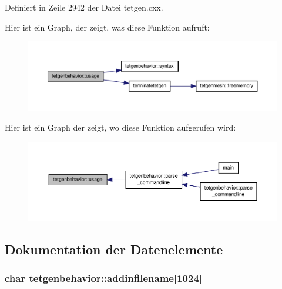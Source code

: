 Definiert in Zeile 2942 der Datei tetgen.\-cxx.



Hier ist ein Graph, der zeigt, was diese Funktion aufruft\-:
\nopagebreak
\begin{figure}[H]
\begin{center}
\leavevmode
\includegraphics[width=350pt]{classtetgenbehavior_aa0bf59fe9ca35269d58e5f1ee10aca05_cgraph}
\end{center}
\end{figure}




Hier ist ein Graph der zeigt, wo diese Funktion aufgerufen wird\-:
\nopagebreak
\begin{figure}[H]
\begin{center}
\leavevmode
\includegraphics[width=350pt]{classtetgenbehavior_aa0bf59fe9ca35269d58e5f1ee10aca05_icgraph}
\end{center}
\end{figure}




\subsection{Dokumentation der Datenelemente}
\hypertarget{classtetgenbehavior_a627804470698cc1883fd93999727e334}{
\subsubsection[{addinfilename}]{\setlength{\rightskip}{0pt plus 5cm}char tetgenbehavior\-::addinfilename\mbox{[}1024\mbox{]}}}\label{classtetgenbehavior_a627804470698cc1883fd93999727e334}


